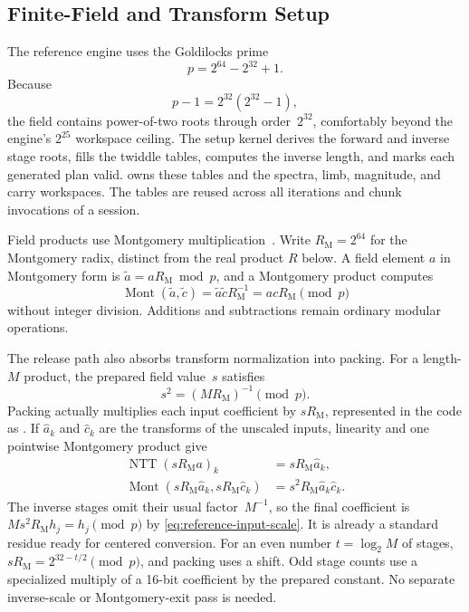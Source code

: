 \subsection{Finite-Field and Transform Setup}
\label{subsec:reference-ntt-field}

The reference engine uses the Goldilocks prime
\begin{equation}
  p=2^{64}-2^{32}+1.
  \label{eq:reference-goldilocks-prime}
\end{equation}
Because
\begin{equation}
  p-1=2^{32}(2^{32}-1),
\end{equation}
the field contains power-of-two roots through order~$2^{32}$, comfortably
beyond the engine's $2^{25}$ workspace ceiling.  The setup kernel derives the
forward and inverse stage roots, fills the twiddle tables, computes the inverse
length, and marks each generated plan valid.  
owns these tables and the spectra, limb, magnitude, and carry workspaces.  The
tables are reused across all iterations and chunk invocations of a session.

Field products use Montgomery multiplication~\cite{Montgomery1985Modular}.
Write $R_{\mathrm M}=2^{64}$ for the Montgomery radix, distinct from the real
product $R$ below.  A field element $a$ in Montgomery form is
$\widetilde a=aR_{\mathrm M}\bmod p$, and a Montgomery product computes
\begin{equation}
  \operatorname{Mont}(\widetilde a,\widetilde c)
  =\widetilde a\widetilde c R_{\mathrm M}^{-1}
  =acR_{\mathrm M}\pmod p
\end{equation}
without integer division.  Additions and subtractions remain ordinary modular
operations.

The release path also absorbs transform normalization into packing.  For a
length-$M$ product, the prepared field value~$s$ satisfies
\begin{equation}
  s^2=(MR_{\mathrm M})^{-1}\pmod p.
  \label{eq:reference-input-scale}
\end{equation}
Packing actually multiplies each input coefficient by $sR_{\mathrm M}$,
represented in the code as .  If $\widehat a_k$ and
$\widehat c_k$ are the transforms of the unscaled inputs, linearity and one
pointwise Montgomery product give
\begin{align}
  \operatorname{NTT}(sR_{\mathrm M}a)_k
    &=sR_{\mathrm M}\widehat a_k, \\
  \operatorname{Mont}(sR_{\mathrm M}\widehat a_k,
                      sR_{\mathrm M}\widehat c_k)
    &=s^2R_{\mathrm M}\widehat a_k\widehat c_k.
\end{align}
The inverse stages omit their usual factor~$M^{-1}$, so the final coefficient
is $Ms^2R_{\mathrm M}h_j=h_j\pmod p$ by
\eqref{eq:reference-input-scale}.  It is already a standard residue ready for
centered conversion.  For an even number $t=\log_2M$ of stages,
$sR_{\mathrm M}=2^{32-t/2}\pmod p$, and packing uses a shift.  Odd stage
counts use a specialized multiply of a 16-bit coefficient by the prepared
constant.  No separate inverse-scale or Montgomery-exit pass is needed.

